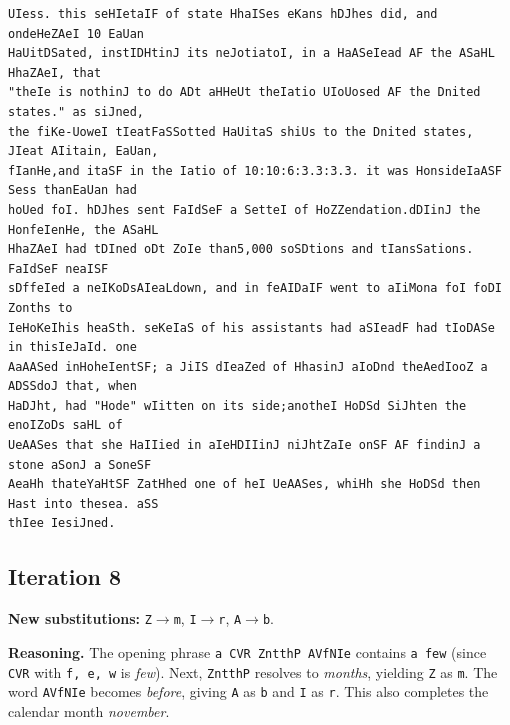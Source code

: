 \documentclass[11pt,a4paper]{article}
\begin{document}
\begin{lstlisting}[style=ciphertext,caption={Complete text after iteration 7}]
UIess. this seHIetaIF of state HhaISes eKans hDJhes did, and ondeHeZAeI 10 EaUan
HaUitDSated, instIDHtinJ its neJotiatoI, in a HaASeIead AF the ASaHL HhaZAeI, that
"theIe is nothinJ to do ADt aHHeUt theIatio UIoUosed AF the Dnited states." as siJned,
the fiKe-UoweI tIeatFaSSotted HaUitaS shiUs to the Dnited states, JIeat AIitain, EaUan,
fIanHe,and itaSF in the Iatio of 10:10:6:3.3:3.3. it was HonsideIaASF Sess thanEaUan had
hoUed foI. hDJhes sent FaIdSeF a SetteI of HoZZendation.dDIinJ the HonfeIenHe, the ASaHL
HhaZAeI had tDIned oDt ZoIe than5,000 soSDtions and tIansSations. FaIdSeF neaISF
sDffeIed a neIKoDsAIeaLdown, and in feAIDaIF went to aIiMona foI foDI Zonths to
IeHoKeIhis heaSth. seKeIaS of his assistants had aSIeadF had tIoDASe in thisIeJaId. one
AaAASed inHoheIentSF; a JiIS dIeaZed of HhasinJ aIoDnd theAedIooZ a ADSSdoJ that, when
HaDJht, had "Hode" wIitten on its side;anotheI HoDSd SiJhten the enoIZoDs saHL of
UeAASes that she HaIIied in aIeHDIIinJ niJhtZaIe onSF AF findinJ a stone aSonJ a SoneSF
AeaHh thateYaHtSF ZatHhed one of heI UeAASes, whiHh she HoDSd then Hast into thesea. aSS
thIee IesiJned.
\end{lstlisting}

\newpage
\subsection{Iteration 8}

\noindent\textbf{New substitutions:} \texttt{Z}$\rightarrow$\texttt{m}, \texttt{I}$\rightarrow$\texttt{r}, \texttt{A}$\rightarrow$\texttt{b}.\par
\smallskip
\noindent\textbf{Reasoning.} The opening phrase \texttt{a CVR ZntthP AVfNIe} contains \texttt{a few} (since \texttt{CVR} with \texttt{f, e, w} is \textit{few}). Next, \texttt{ZntthP} resolves to \textit{months}, yielding \texttt{Z} as \texttt{m}. The word \texttt{AVfNIe} becomes \textit{before}, giving \texttt{A} as \texttt{b} and \texttt{I} as \texttt{r}. This also completes the calendar month \textit{november}.
\end{document}
